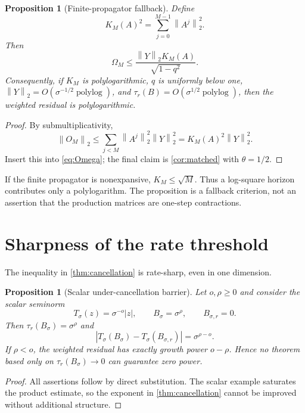 \documentclass[11pt]{article}
\newtheorem{proposition}[theorem]{Proposition}
\theoremstyle{definition}
\theoremstyle{remark}
\newcommand{\norm}[1]{\left\lVert#1\right\rVert}
\begin{document}
\begin{proposition}[Finite-propagator fallback]
 \label{prop:fallback}
 Define
 \[
 K_M(A)^2=\sum_{j=0}^{M-1}\norm{A^j}_2^2.
 \]
 Then
 \begin{equation}
 \Omega_M
 \le \frac{\norm{Y}_2 K_M(A)}{\sqrt{1-q^2}}.
 \label{eq:fallback}
 \end{equation}
 Consequently, if $K_M$ is polylogarithmic, $q$ is uniformly below one,
 $\norm{Y}_2=O(\sigma^{-1/2}\operatorname{polylog})$, and
 $\tau_r(B)=O(\sigma^{1/2}\operatorname{polylog})$, then the weighted residual
 is polylogarithmic.
\end{proposition}

\begin{proof}
 By submultiplicativity,
 \[
 \norm{O_M}_2
 \le\sum_{j<M}\norm{A^j}_2^2\norm{Y}_2^2
 =K_M(A)^2\norm{Y}_2^2.
 \]
 Insert this into \eqref{eq:Omega}; the final claim is
 \cref{cor:matched} with $\theta=1/2$.
\end{proof}

If the finite propagator is nonexpansive, $K_M\le\sqrt M$.  Thus a
log-square horizon contributes only a polylogarithm.  The proposition is a
fallback criterion, not an assertion that the production matrices are
one-step contractions.

\section{Sharpness of the rate threshold}
\label{sec:sharp}

The inequality in \cref{thm:cancellation} is rate-sharp, even in one
dimension.

\begin{proposition}[Scalar under-cancellation barrier]
 \label{prop:sharp}
 Let $o,\rho\ge0$ and consider the scalar seminorm
 \[
 T_\sigma(z)=\sigma^{-o}|z|,
 \qquad B_\sigma=\sigma^\rho,
 \qquad B_{\sigma,r}=0.
 \]
 Then $\tau_r(B_\sigma)=\sigma^\rho$ and
 \begin{equation}
 \left|T_\sigma(B_\sigma)-T_\sigma(B_{\sigma,r})\right|
 =\sigma^{\rho-o}.
 \label{eq:sharp}
 \end{equation}
 If $\rho<o$, the weighted residual has exactly growth power $o-\rho$.
 Hence no theorem based only on $\tau_r(B_\sigma)\to0$ can guarantee zero
 power.
\end{proposition}

\begin{proof}
 All assertions follow by direct substitution.  The scalar example saturates
 the product estimate, so the exponent in \cref{thm:cancellation} cannot be
 improved without additional structure.
\end{proof}
\end{document}
